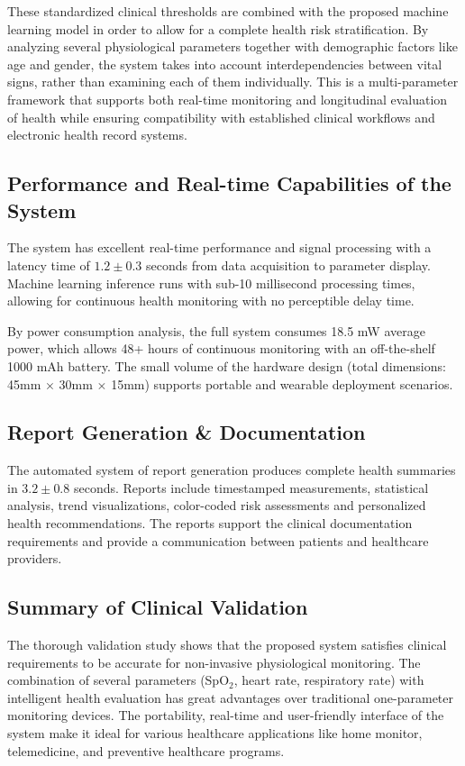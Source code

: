 \documentclass{ieeeaccess}
\begin{document}
These standardized clinical thresholds are combined with the proposed machine learning model in order to allow for a complete health risk stratification. By analyzing several physiological parameters together with demographic factors like age and gender, the system takes into account interdependencies between vital signs, rather than examining each of them individually. This is a multi-parameter framework that supports both real-time monitoring and longitudinal evaluation of health while ensuring compatibility with established clinical workflows and electronic health record systems.

\subsection{Performance and Real-time Capabilities of the System}

The system has excellent real-time performance and signal processing with a latency time of $1.2 \pm 0.3$ seconds from data acquisition to parameter display. Machine learning inference runs with sub-10 millisecond processing times, allowing for continuous health monitoring with no perceptible delay time.

By power consumption analysis, the full system consumes 18.5 mW average power, which allows 48+ hours of continuous monitoring with an off-the-shelf 1000 mAh battery. The small volume of the hardware design (total dimensions: 45mm $\times$ 30mm $\times$ 15mm) supports portable and wearable deployment scenarios.


\subsection{Report Generation \& Documentation}
The automated system of report generation produces complete health summaries in $3.2 \pm 0.8$ seconds. Reports include timestamped measurements, statistical analysis, trend visualizations, color-coded risk assessments and personalized health recommendations. The reports support the clinical documentation requirements and provide a communication between patients and healthcare providers.

\subsection{Summary of Clinical Validation}
The thorough validation study shows that the proposed system satisfies clinical requirements to be accurate for non-invasive physiological monitoring. The combination of several parameters (SpO$_2$, heart rate, respiratory rate) with intelligent health evaluation has great advantages over traditional one-parameter monitoring devices. The portability, real-time and user-friendly interface of the system make it ideal for various healthcare applications like home monitor, telemedicine, and preventive healthcare programs.
\end{document}
